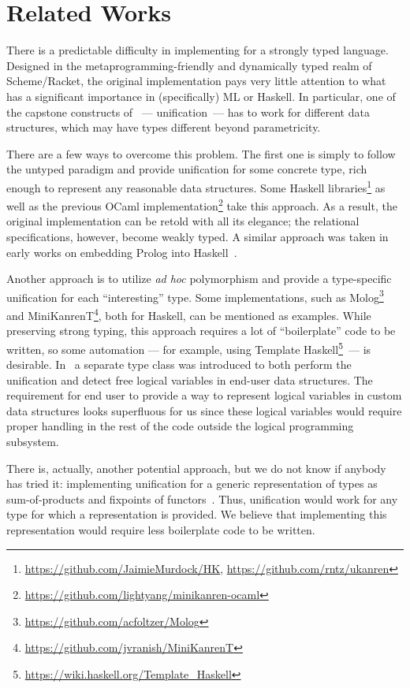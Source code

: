 \section{Related Works}
\label{sec:relworks}

There is a predictable difficulty in implementing \miniKanren for a strongly typed language.
Designed in the metaprogramming-friendly and dynamically typed realm of Scheme/Racket, the original
\miniKanren implementation pays very little attention to what has a significant importance in (specifically)
ML or Haskell. In particular, one of the capstone constructs of \miniKanren~--- unification~--- has to work for
different data structures, which may have types different beyond parametricity.

There are a few ways to overcome this problem. The first one is simply to follow the untyped paradigm and
provide unification for some concrete type, rich enough to represent any reasonable data structures.
Some Haskell \miniKanren libraries\footnote{\url{https://github.com/JaimieMurdock/HK}, \url{https://github.com/rntz/ukanren}}
as well as the previous OCaml implementation\footnote{\url{https://github.com/lightyang/minikanren-ocaml}} take this approach.
As a result, the original implementation can be retold with all its elegance; the relational specifications, however,
become weakly typed. A similar approach was taken in early works on embedding Prolog into Haskell~\cite{PrologInHaskell}.

Another approach is to utilize \emph{ad hoc} polymorphism and provide a type-specific unification for each ``interesting'' type.
Some \miniKanren implementations, such as Molog\footnote{\url{https://github.com/acfoltzer/Molog}} and
MiniKanrenT\footnote{\url{https://github.com/jvranish/MiniKanrenT}}, both for Haskell, can be mentioned as examples.
While preserving strong typing, this approach requires a lot of ``boilerplate''
code to be written, so some automation --- for example, using 
Template Haskell\footnote{\url{https://wiki.haskell.org/Template_Haskell}}~\cite{SheardTMH}---
is desirable. In~\cite{TypedLogicalVariables} a separate type class was introduced to both perform the unification
and detect free logical variables in end-user data structures. The requirement for end user to provide a way to represent
logical variables in custom data structures looks superfluous for us since these logical variables would require proper
handling in the rest of the code outside the logical programming subsystem.

There is, actually, another potential approach, but we do not know if anybody has tried
it: implementing unification for a generic representation of types as sum-of-products and fixpoints of
functors~\cite{InstantGenerics, ALaCarte}. Thus, unification would work for any type for which a representation
is provided. We believe that implementing this representation would require less boilerplate code to be written.

